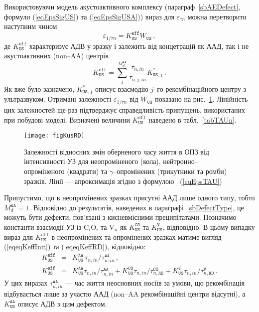 Використовуючи модель акустоактивного комплексу (параграф~\ref{sbAEDefect}, формули (\ref{eqEpsSigUS}) та (\ref{eqEpsSigUSA}))
вираз для $\varepsilon_{\tau n}$ можна перетворити наступним чином
\begin{equation}
\label{eqEpsTAU}
\varepsilon_{1/\tau n}=K_\mathtt{US}^\mathtt{eff}W_\mathtt{US}\,,
\end{equation}
де
$K_\mathtt{US}^\mathtt{eff}$ характеризує АДВ у зразку і залежить від
концетрацій як ААД, так і не акустоактивних (non--AA) центрів
\begin{equation}
\label{eqKeff}
K_\mathtt{US}^\mathtt{eff}=\sum_j^{M_d^\mathtt{AA}}\frac{\tau_{n,in}}{\tau_{n,j,in}}K_\mathtt{US,j}^{*}\,.
\end{equation}
Як вже було зазначено, $K_\mathtt{US,j}^*$ описує взаємодію $j$--го рекомбінаційного центру з ультразвуком.
Отримані залежності $\varepsilon_{1/\tau n}$ від $W_\mathtt{US}$ показано на рис.~\ref{figKusRD}.
Лінійність цих залежностей ще раз підтверджує справедливість припущень, використаних при побудові
моделі.
Визначені величини $K_\mathtt{US}^\mathtt{eff}$ наведено в табл.~\ref{tabTAUn}.


\begin{figure}
\center
\texttt{[image: figKusRD]}
\caption{\label{figKusRD}
Залежності відносних змін оберненого часу життя в ОПЗ від інтенсивності УЗ для
неопроміненого (кола), нейтронно--опроміненого (квадрати) та $\gamma$--опромінених (трикутники та ромби) зразків.
Лінії --- апроксимація згідно з формулою ~(\ref{eqEpsTAU})
}%
\end{figure}

Припустимо,
що в неопромінених зразках присутні ААД лише одного типу, тобто $M_d^\mathtt{AA}=1$.
Відповідно до результатів, наведених в параграфі~\ref{sbDefectType}, це можуть бути дефекти, пов'язані з кисневмісними преципітатами.
Позначимо константи взаємодії УЗ із C$_i$O$_i$ та V$_n$ як $K_\mathtt{US}^\mathtt{CO}$ та $K_\mathtt{US}^\mathtt{V}$, відповідно.
В цьому випадку вираз для $K_\mathtt{US}^\mathtt{eff}$ в неопромінених та опромінених зразках
матиме вигляд (\ref{eqeqKeffInit}) та (\ref{eqeqKeffRD}), відповідно:
\begin{eqnarray}
K_\mathtt{US}^\mathtt{eff}&=&K_\mathtt{US}^\mathtt{AA}\,\tau_{n,in}/\tau_{n,in}^\mathtt{AA}\,,\label{eqeqKeffInit}\\
K_\mathtt{US}^\mathtt{eff}&=&K_\mathtt{US}^\mathtt{AA}\tau_{n,in}/\tau_{n,in}^\mathtt{AA}+
                           K_\mathtt{US}^\mathtt{CO}\tau_{n,in}/\tau_{n,\mathtt{RD}}^\mathtt{CO}+
                           K_\mathtt{US}^\mathtt{V}\tau_{n,in}/\tau_{n,\mathtt{RD}}^\mathtt{V} \,.\label{eqeqKeffRD}
\end{eqnarray}
У цих виразах $\tau_{n,in}^\mathtt{AA}$ --- час життя неосновних носіїв за умови, що рекомбінація
відбувається лише за участю ААД (non--AA рекомбінаційні центри відсутні),
а $K_\mathtt{US}^\mathtt{AA}$ описує АДВ з цим дефектом.

